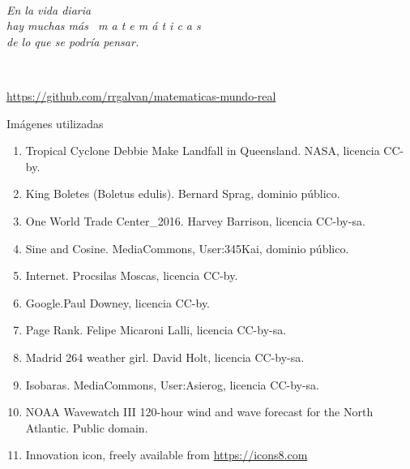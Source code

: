 \documentclass[
  unknownkeysallowed %
]{beamer}
\begin{document}
\begin{frame}{~}
  \begin{flushleft}\em
    En la vida diaria
    \\[1.2em]
    hay muchas más \ \alert{\large m a t e m á t i c a s}
    \\[1.2em]
    de lo que se podría pensar.
  \end{flushleft}
  \bigskip
  \begin{flushright}
    \Huge{}
  \end{flushright}
  \vfill
  \vfill
  ~
  \begin{flushright}
    \color{gray}\scriptsize\url{https://github.com/rrgalvan/matematicas-mundo-real}
  \end{flushright}
\end{frame}

\begin{frame}{Imágenes utilizadas}
  \scriptsize
  \begin{enumerate}
  \item Tropical Cyclone Debbie Make Landfall in Queensland. NASA, licencia CC-by.
  \item King Boletes (Boletus edulis). Bernard Sprag, dominio público.
  \item One World Trade Center\_2016. Harvey Barrison, licencia CC-by-sa.
  \item Sine and Cosine. MediaCommons, User:345Kai, dominio público.
  \item Internet. Procsilas Moscas, licencia CC-by.
  \item Google.Paul Downey, licencia CC-by.
  \item Page Rank. Felipe Micaroni Lalli, licencia CC-by-sa.
  \item Madrid 264 weather girl. David Holt, licencia CC-by-sa.
  \item Isobaras. MediaCommons, User:Asierog, licencia CC-by-sa.
  \item NOAA Wavewatch III 120-hour wind and wave forecast for the
    North Atlantic. Public domain.
  \item Innovation icon, freely available from \url{https://icons8.com}
  \end{enumerate}
\end{frame}
\end{document}
